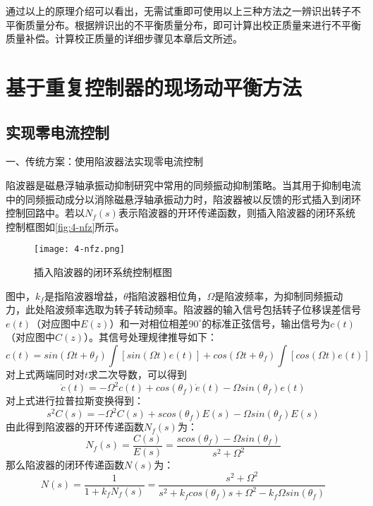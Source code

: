 通过以上的原理介绍可以看出，无需试重即可使用以上三种方法之一辨识出转子不平衡质量分布。根据辨识出的不平衡质量分布，即可计算出校正质量来进行不平衡质量补偿。计算校正质量的详细步骤见本章后文所述。

\section{基于重复控制器的现场动平衡方法}

\subsection{实现零电流控制}

一、传统方案：使用陷波器法实现零电流控制

陷波器是磁悬浮轴承振动抑制研究中常用的同频振动抑制策略。当其用于抑制电流中的同频振动成分以消除磁悬浮轴承振动力时，陷波器被以反馈的形式插入到闭环控制回路中。若以$N_f(s)$表示陷波器的开环传递函数，则插入陷波器的闭环系统控制框图如\autoref{fig:4-nfz}所示。

\begin{figure}
	\texttt{[image: 4-nfz.png]}
	\caption{插入陷波器的闭环系统控制框图}
	\label{fig:4-nfz}
\end{figure}

图中，$k_f$是指陷波器增益，$\theta$指陷波器相位角，$\Omega$是陷波频率，为抑制同频振动力，此处陷波频率选取为转子转动频率。陷波器的输入信号包括转子位移误差信号$e(t)$（对应图中$E(z)$）和一对相位相差$90^{\circ}$的标准正弦信号，输出信号为$c(t)$（对应图中$C(z)$）。其信号处理规律推导如下：
\begin{equation}
c(t) = sin(\Omega t + \theta _f) \int [sin(\Omega t)e(t)]+cos(\Omega t + \theta _f) \int [cos(\Omega t)e(t)]
\end{equation}
对上式两端同时对$t$求二次导数，可以得到
\begin{equation}
\ddot{c}(t) = -{\Omega}^2c(t)+cos(\theta _f)\dot{e}(t)-\Omega sin(\theta _f)e(t)
\end{equation}
对上式进行拉普拉斯变换得到：
\begin{equation}
s^2C(s) = -{\Omega}^2C(s)+scos(\theta _f)E(s)-\Omega sin(\theta _f)E(s)
\end{equation}
由此得到陷波器的开环传递函数$N_f(s)$为：
\begin{equation}
N_f(s) = \frac{C(s)}{E(s)} = \frac{scos(\theta _f) - \Omega sin(\theta _f)}{s^2 + {\Omega}^2}
\end{equation}
那么陷波器的闭环传递函数$N(s)$为：
\begin{equation}
N(s) = \frac{1}{1+k_fN_f(s)}=\frac{s^2+{\Omega}^2}{s^2+k_fcos(\theta _f)s + {\Omega}^2-k_f\Omega sin(\theta _f)}
\end{equation}


